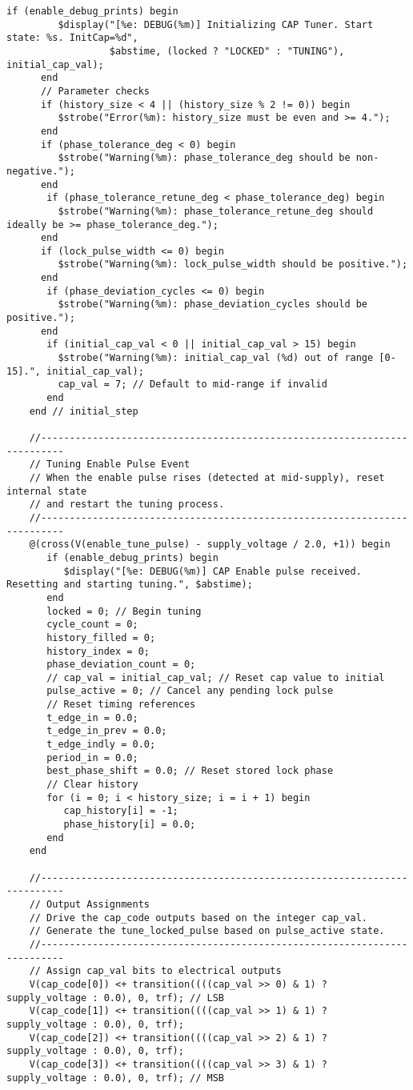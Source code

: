 \begin{lstlisting}[caption={Verilog-A Generic Capacitor Tuner Implementation}]
      if (enable_debug_prints) begin
         $display("[%e: DEBUG(%m)] Initializing CAP Tuner. Start state: %s. InitCap=%d",
                  $abstime, (locked ? "LOCKED" : "TUNING"), initial_cap_val);
      end
      // Parameter checks
      if (history_size < 4 || (history_size % 2 != 0)) begin
         $strobe("Error(%m): history_size must be even and >= 4.");
      end
      if (phase_tolerance_deg < 0) begin
         $strobe("Warning(%m): phase_tolerance_deg should be non-negative.");
      end
       if (phase_tolerance_retune_deg < phase_tolerance_deg) begin
         $strobe("Warning(%m): phase_tolerance_retune_deg should ideally be >= phase_tolerance_deg.");
      end
      if (lock_pulse_width <= 0) begin
         $strobe("Warning(%m): lock_pulse_width should be positive.");
      end
       if (phase_deviation_cycles <= 0) begin
         $strobe("Warning(%m): phase_deviation_cycles should be positive.");
      end
       if (initial_cap_val < 0 || initial_cap_val > 15) begin
         $strobe("Warning(%m): initial_cap_val (%d) out of range [0-15].", initial_cap_val);
         cap_val = 7; // Default to mid-range if invalid
       end
    end // initial_step

    //--------------------------------------------------------------------------
    // Tuning Enable Pulse Event
    // When the enable pulse rises (detected at mid-supply), reset internal state
    // and restart the tuning process.
    //--------------------------------------------------------------------------
    @(cross(V(enable_tune_pulse) - supply_voltage / 2.0, +1)) begin
       if (enable_debug_prints) begin
          $display("[%e: DEBUG(%m)] CAP Enable pulse received. Resetting and starting tuning.", $abstime);
       end
       locked = 0; // Begin tuning
       cycle_count = 0;
       history_filled = 0;
       history_index = 0;
       phase_deviation_count = 0;
       // cap_val = initial_cap_val; // Reset cap value to initial
       pulse_active = 0; // Cancel any pending lock pulse
       // Reset timing references
       t_edge_in = 0.0;
       t_edge_in_prev = 0.0;
       t_edge_indly = 0.0;
       period_in = 0.0;
       best_phase_shift = 0.0; // Reset stored lock phase
       // Clear history
       for (i = 0; i < history_size; i = i + 1) begin
          cap_history[i] = -1;
          phase_history[i] = 0.0;
       end
    end

    //--------------------------------------------------------------------------
    // Output Assignments
    // Drive the cap_code outputs based on the integer cap_val.
    // Generate the tune_locked_pulse based on pulse_active state.
    //--------------------------------------------------------------------------
    // Assign cap_val bits to electrical outputs
    V(cap_code[0]) <+ transition((((cap_val >> 0) & 1) ? supply_voltage : 0.0), 0, trf); // LSB
    V(cap_code[1]) <+ transition((((cap_val >> 1) & 1) ? supply_voltage : 0.0), 0, trf);
    V(cap_code[2]) <+ transition((((cap_val >> 2) & 1) ? supply_voltage : 0.0), 0, trf);
    V(cap_code[3]) <+ transition((((cap_val >> 3) & 1) ? supply_voltage : 0.0), 0, trf); // MSB


\end{lstlisting}
